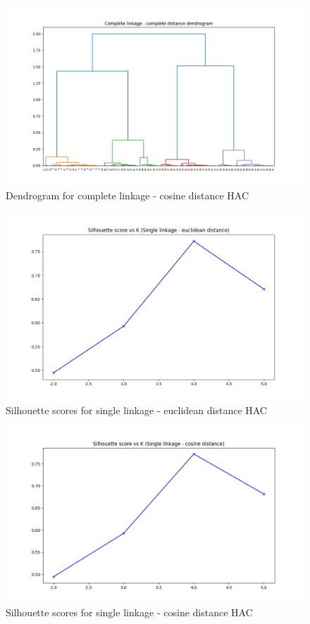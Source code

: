 \documentclass[12pt,a4paper, margin=1in]{article}
\begin{document}
\begin{figure}[H]
    \centering
    \includegraphics[scale=0.5]{complete_cosine_dendrogram.png}
    \caption{Dendrogram for complete linkage - cosine distance HAC}
\end{figure}

\begin{figure}[H]
    \centering
    \includegraphics[scale=0.6]{single_euclidean_silh.png}
    \caption{Silhouette scores for single linkage - euclidean distance HAC}
\end{figure}

\begin{figure}[H]
    \centering
    \includegraphics[scale=0.6]{single_cosine_silh.png}
    \caption{Silhouette scores for single linkage - cosine distance HAC}
\end{figure}
\end{document}
